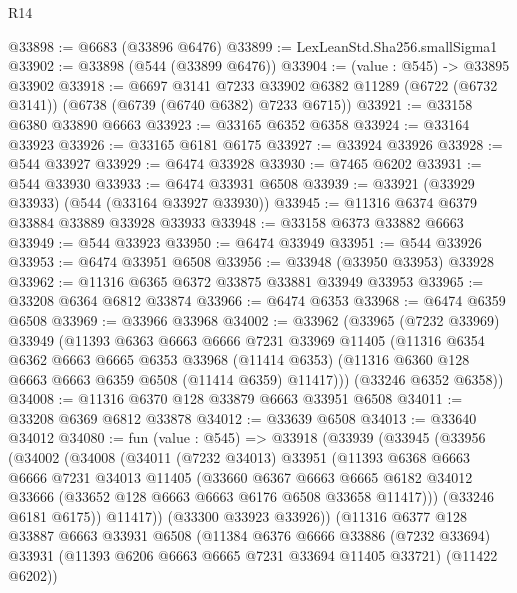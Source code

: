 \begin{lexlean}{R14}
\begin{coremodule}
@33898 := @6683 (@33896 @6476)
@33899 := LexLeanStd.Sha256.smallSigma1
@33902 := @33898 (@544 (@33899 @6476))
@33904 := (value : @545) -> @33895 @33902
@33918 := @6697
    @3141
    @7233
    @33902
    @6382
    @11289
    (@6722 (@6732 @3141))
    (@6738 (@6739 (@6740 @6382) @7233 @6715))
@33921 := @33158 @6380 @33890 @6663
@33923 := @33165 @6352 @6358
@33924 := @33164 @33923
@33926 := @33165 @6181 @6175
@33927 := @33924 @33926
@33928 := @544 @33927
@33929 := @6474 @33928
@33930 := @7465 @6202
@33931 := @544 @33930
@33933 := @6474 @33931 @6508
@33939 := @33921 (@33929 @33933) (@544 (@33164 @33927 @33930))
@33945 := @11316 @6374 @6379 @33884 @33889 @33928 @33933
@33948 := @33158 @6373 @33882 @6663
@33949 := @544 @33923
@33950 := @6474 @33949
@33951 := @544 @33926
@33953 := @6474 @33951 @6508
@33956 := @33948 (@33950 @33953) @33928
@33962 := @11316 @6365 @6372 @33875 @33881 @33949 @33953
@33965 := @33208 @6364 @6812 @33874
@33966 := @6474 @6353
@33968 := @6474 @6359 @6508
@33969 := @33966 @33968
@34002 := @33962
    (@33965
      (@7232 @33969)
      @33949
      (@11393
        @6363
        @6663
        @6666
        @7231
        @33969
        @11405
        (@11316
          @6354
          @6362
          @6663
          @6665
          @6353
          @33968
          (@11414 @6353)
          (@11316 @6360 @128 @6663 @6663 @6359 @6508 (@11414 @6359) @11417)))
      (@33246 @6352 @6358))
@34008 := @11316 @6370 @128 @33879 @6663 @33951 @6508
@34011 := @33208 @6369 @6812 @33878
@34012 := @33639 @6508
@34013 := @33640 @34012
@34080 := fun (value : @545) =>
  @33918
    (@33939
      (@33945
        (@33956
          (@34002
            (@34008
              (@34011
                (@7232 @34013)
                @33951
                (@11393
                  @6368
                  @6663
                  @6666
                  @7231
                  @34013
                  @11405
                  (@33660
                    @6367
                    @6663
                    @6665
                    @6182
                    @34012
                    @33666
                    (@33652 @128 @6663 @6663 @6176 @6508 @33658 @11417)))
                (@33246 @6181 @6175))
              @11417))
          (@33300 @33923 @33926))
        (@11316
          @6377
          @128
          @33887
          @6663
          @33931
          @6508
          (@11384
            @6376
            @6666
            @33886
            (@7232 @33694)
            @33931
            (@11393 @6206 @6663 @6665 @7231 @33694 @11405 @33721)
            (@11422 @6202))

\end{coremodule}
\end{lexlean}

